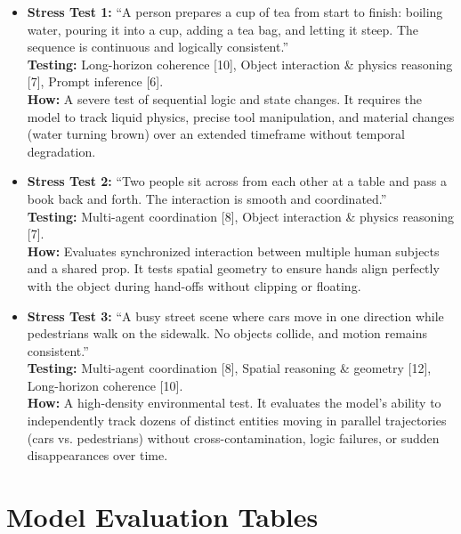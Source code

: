 \documentclass[sigconf]{acmart}
\begin{document}
\begin{itemize}
    \item \textbf{Stress Test 1:} ``A person prepares a cup of tea from start to finish: boiling water, pouring it into a cup, adding a tea bag, and letting it steep. The sequence is continuous and logically consistent.''
          \\ \textbf{Testing:} Long-horizon coherence [10], Object interaction \& physics reasoning [7], Prompt inference [6].
          \\ \textbf{How:} A severe test of sequential logic and state changes. It requires the model to track liquid physics, precise tool manipulation, and material changes (water turning brown) over an extended timeframe without temporal degradation.

    \item \textbf{Stress Test 2:} ``Two people sit across from each other at a table and pass a book back and forth. The interaction is smooth and coordinated.''
          \\ \textbf{Testing:} Multi-agent coordination [8], Object interaction \& physics reasoning [7].
          \\ \textbf{How:} Evaluates synchronized interaction between multiple human subjects and a shared prop. It tests spatial geometry to ensure hands align perfectly with the object during hand-offs without clipping or floating.

    \item \textbf{Stress Test 3:} ``A busy street scene where cars move in one direction while pedestrians walk on the sidewalk. No objects collide, and motion remains consistent.''
          \\ \textbf{Testing:} Multi-agent coordination [8], Spatial reasoning \& geometry [12], Long-horizon coherence [10].
          \\ \textbf{How:} A high-density environmental test. It evaluates the model's ability to independently track dozens of distinct entities moving in parallel trajectories (cars vs. pedestrians) without cross-contamination, logic failures, or sudden disappearances over time.
\end{itemize}

\section{Model Evaluation Tables} \label{sec:evaluation_tables}
\end{document}
